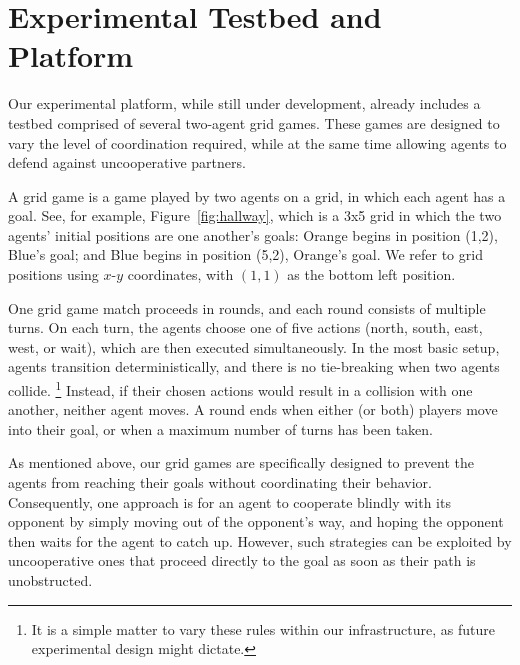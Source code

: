 
\section{Experimental Testbed and Platform}
\label{sec:grid_games}


Our experimental platform, while still under development, already
includes a testbed comprised of several two-agent grid games.  These
games are designed to vary the level of coordination required, while
at the same time allowing agents to defend against uncooperative
partners.

A grid game is a game played by two agents on a grid, in which each
agent has a goal.  See, for example, Figure~\ref{fig:hallway}, which
is a 3x5 grid in which the two agents' initial positions are one
another's goals: Orange begins in position (1,2), Blue's goal; and
Blue begins in position (5,2), Orange's goal.  We refer to grid
positions using $x$-$y$ coordinates, with $(1,1)$ as the bottom left
position.

One grid game match proceeds in rounds,
and each round consists of multiple turns.
On each turn, the agents choose one of five actions (north, south,
east, west, or wait), which are then executed simultaneously.  In the
most basic setup, agents transition deterministically, and
there is no tie-breaking when two agents collide.%
\footnote{It is a simple matter to vary these rules within our
  infrastructure, as future experimental design might dictate.}
%
Instead, if their chosen actions would result in a collision with one
another, neither agent moves.  A round ends when either (or both)
players move into their goal, or when a maximum number of turns has
been taken.

As mentioned above, our grid games are specifically designed to
prevent the agents from reaching their goals without coordinating
their behavior.
% 
Consequently, one approach is for an agent to cooperate blindly with
its opponent by simply moving out of the opponent's way, and hoping
the opponent then waits for the agent to catch up.  However, such
strategies can be exploited by uncooperative ones that proceed
directly to the goal as soon as their path is unobstructed.
 

